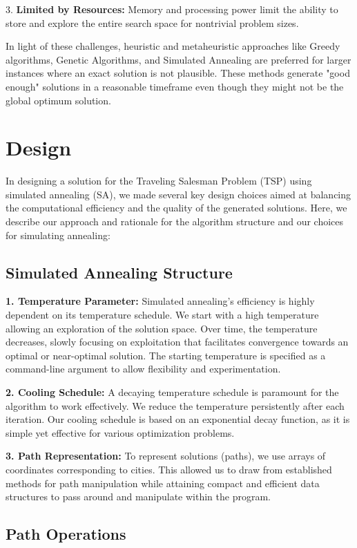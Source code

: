 \documentclass[a4paper,10pt]{article}
\begin{document}
3. \textbf{Limited by Resources:} Memory and processing power limit the ability to store and explore the entire search space for nontrivial problem sizes.

In light of these challenges, heuristic and metaheuristic approaches like Greedy algorithms, Genetic Algorithms, and Simulated Annealing are preferred for larger instances where an exact solution is not plausible. These methods generate "good enough" solutions in a reasonable timeframe even though they might not be the global optimum solution.

\section{Design}

In designing a solution for the Traveling Salesman Problem (TSP) using simulated annealing (SA), we made several key design choices aimed at balancing the computational efficiency and the quality of the generated solutions. Here, we describe our approach and rationale for the algorithm structure and our choices for simulating annealing:

\subsection{Simulated Annealing Structure}

\textbf{1. Temperature Parameter:} Simulated annealing's efficiency is highly dependent on its temperature schedule. We start with a high temperature allowing an exploration of the solution space. Over time, the temperature decreases, slowly focusing on exploitation that facilitates convergence towards an optimal or near-optimal solution. The starting temperature is specified as a command-line argument to allow flexibility and experimentation. 

\textbf{2. Cooling Schedule:} A decaying temperature schedule is paramount for the algorithm to work effectively. We reduce the temperature persistently after each iteration. Our cooling schedule is based on an exponential decay function, as it is simple yet effective for various optimization problems.

\textbf{3. Path Representation:} To represent solutions (paths), we use arrays of coordinates corresponding to cities. This allowed us to draw from established methods for path manipulation while attaining compact and efficient data structures to pass around and manipulate within the program.

\subsection{Path Operations}
\end{document}
